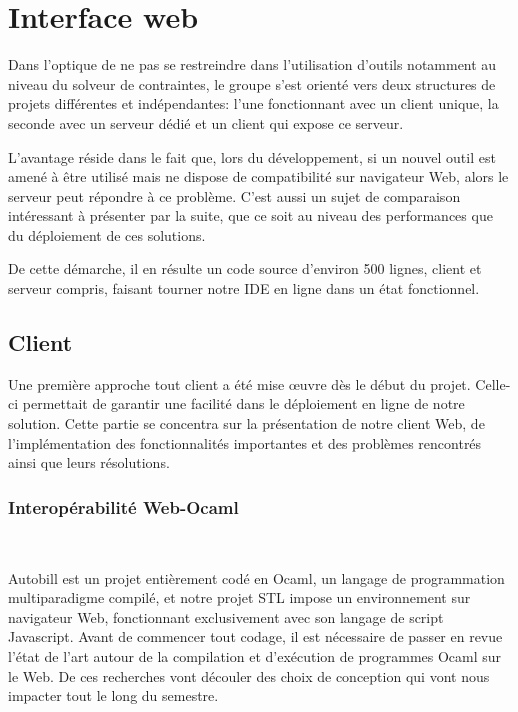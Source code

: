 \documentclass[12pt]{article}
\begin{document}
\newpage

\hypertarget{interface-web}{%
      \section{Interface web}\label{interface-web}}

Dans l'optique de ne pas se restreindre dans l'utilisation d'outils
notamment au niveau du solveur de contraintes, le groupe s'est orienté
vers deux structures de projets différentes et indépendantes: l'une
fonctionnant avec un client unique, la seconde avec un serveur dédié et
un client qui expose ce serveur.

L'avantage réside dans le fait que, lors du développement, si un nouvel
outil est amené à être utilisé mais ne dispose de compatibilité sur
navigateur Web, alors le serveur peut répondre à ce problème. C'est
aussi un sujet de comparaison intéressant à présenter par la suite, que
ce soit au niveau des performances que du déploiement de ces solutions.

De cette démarche, il en résulte un code source d'environ 500 lignes,
client et serveur compris, faisant tourner notre IDE en ligne dans un
état fonctionnel.

\subsection{Client}

Une première approche tout client a été mise œuvre dès le début du
projet. Celle-ci permettait de garantir une facilité dans le déploiement
en ligne de notre solution. Cette partie se concentra sur la présentation de
notre client Web, de l'implémentation des fonctionnalités importantes et des problèmes rencontrés ainsi que leurs résolutions.

\subsubsection{Interopérabilité Web-Ocaml}\

Autobill est un projet entièrement codé en Ocaml, un langage de programmation multiparadigme compilé, et notre projet STL impose un environnement sur navigateur Web, fonctionnant exclusivement avec son langage de script Javascript. Avant de commencer tout codage, il est nécessaire de passer en revue l'état de l'art autour de la compilation et d'exécution de programmes Ocaml sur le Web. De ces recherches vont découler  des choix de conception qui vont nous impacter tout le long du semestre. \\
\end{document}
